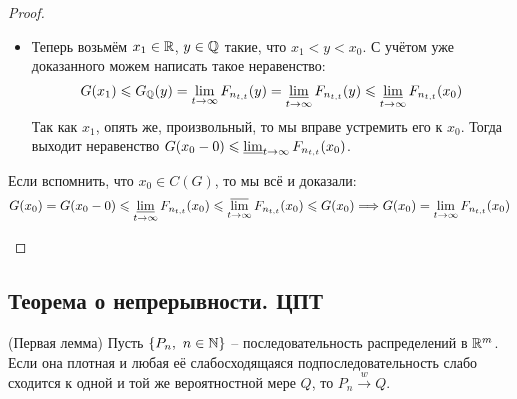 \begin{proof}
\begin{itemize}
\begin{itemize}
    		\item Теперь возьмём $x_1 \in \R$, $y \in \Q$ такие, что $x_1 < y < x_0$. С учётом уже доказанного можем написать такое неравенство:
    		\[
    			G(x_1) \le G_\Q(y) = \lim_{t \to \infty} F_{n_{t, t}}(y) = \varliminf_{t \to \infty} F_{n_{t, t}}(y) \le \varliminf_{t \to \infty} F_{n_{t, t}}(x_0)
    		\]
    		Так как $x_1$, опять же, произвольный, то мы вправе устремить его к $x_0$. Тогда выходит неравенство $G(x_0 - 0) \le \varliminf_{t \to \infty} F_{n_{t, t}}(x_0)$.
    	\end{itemize}
    	Если вспомнить, что $x_0 \in C(G)$, то мы всё и доказали:
    	\[
    		G(x_0) = G(x_0 - 0) \le \varliminf_{t \to \infty} F_{n_{t, t}}(x_0) \le \varlimsup_{t \to \infty} F_{n_{t, t}}(x_0) \le G(x_0) \Lora G(x_0) = \lim_{t \to \infty} F_{n_{t, t}}(x_0)
    	\]
    \end{itemize}
\end{proof}

\subsection{Теорема о непрерывности. ЦПТ}

\begin{lemma} (Первая лемма)
    Пусть $\{P_n,\ n \in \N\}$ -- последовательность распределений в $\R^m$. Если она плотная и любая её слабосходящаяся подпоследовательность слабо сходится к одной и той же вероятностной мере $Q$, то $P_n \xrightarrow{w} Q$.
\end{lemma}

